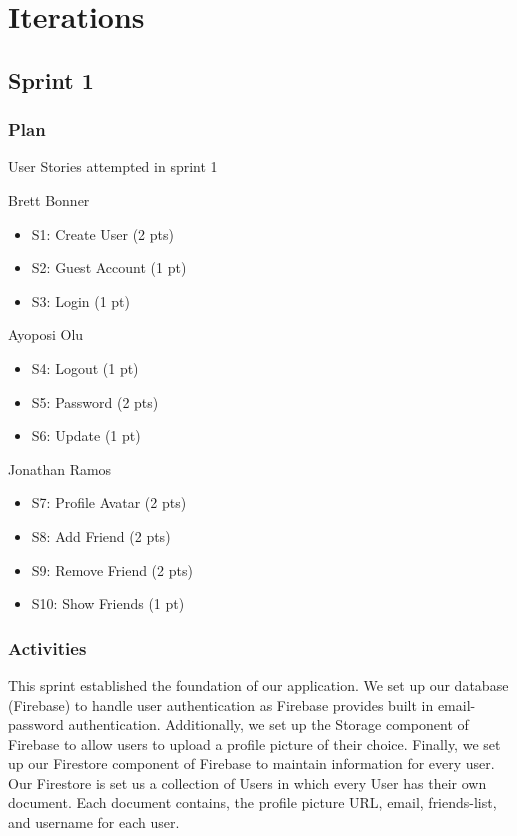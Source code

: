 \section{Iterations}



\subsection{Sprint 1}

\subsubsection{Plan}
User Stories attempted in sprint 1 

Brett Bonner
\begin{itemize}
    \item S1: Create User (2 pts)
    \item S2: Guest Account (1 pt)
    \item S3: Login (1 pt)
\end{itemize}


Ayoposi Olu

\begin{itemize}
    \item S4: Logout (1 pt)
    \item S5: Password (2 pts)
    \item S6: Update (1 pt)
\end{itemize}


Jonathan Ramos

\begin{itemize}
    \item S7: Profile Avatar (2 pts)
    \item S8: Add Friend (2 pts)
    \item S9: Remove Friend (2 pts)
    \item S10: Show Friends (1 pt)
\end{itemize}

\subsubsection{Activities}

This sprint established the foundation of our application. We set up our database (Firebase) to handle user authentication as Firebase provides built in email-password authentication. Additionally, we set up the Storage component of Firebase to allow users to upload a profile picture of their choice. Finally, we set up our Firestore component of Firebase to maintain information for every user. Our Firestore is set us a collection of Users in which every User has their own document. Each document contains, the profile picture URL, email, friends-list, and username for each user. 

